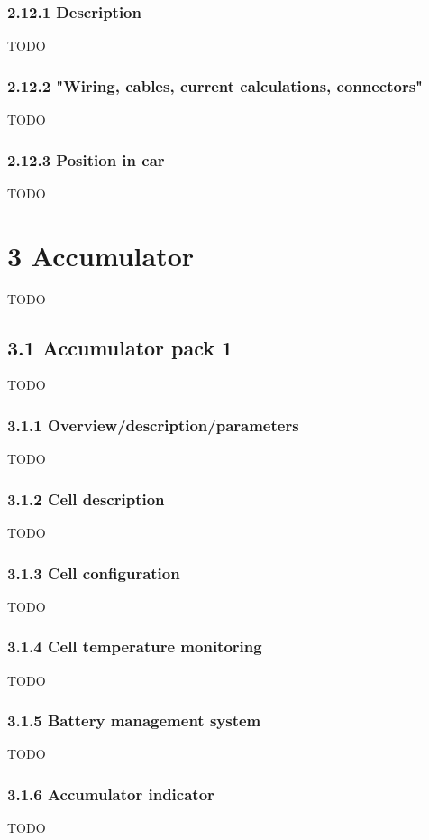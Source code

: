 \documentclass{article}
\begin{document}
\subsubsection*{2.12.1 Description}
TODO

\subsubsection*{2.12.2 "Wiring, cables, current calculations, connectors"}
TODO

\subsubsection*{2.12.3 Position in car}
TODO

\section*{3 Accumulator}
TODO

\subsection*{3.1 Accumulator pack 1}
TODO

\subsubsection*{3.1.1 Overview/description/parameters}
TODO

\subsubsection*{3.1.2 Cell description}
TODO

\subsubsection*{3.1.3 Cell configuration}
TODO

\subsubsection*{3.1.4 Cell temperature monitoring}
TODO

\subsubsection*{3.1.5 Battery management system}
TODO

\subsubsection*{3.1.6 Accumulator indicator}
TODO
\end{document}
